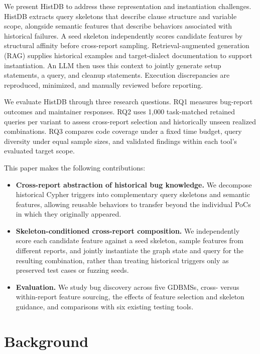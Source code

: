 \documentclass[acmsmall,screen,anonymous]{acmart}
\begin{document}
We present HistDB to address these representation and instantiation challenges. HistDB extracts query skeletons that describe clause structure and variable scope, alongside semantic features that describe behaviors associated with historical failures. A seed skeleton independently scores candidate features by structural affinity before cross-report sampling. Retrieval-augmented generation (RAG) supplies historical examples and target-dialect documentation to support instantiation. An LLM then uses this context to jointly generate setup statements, a query, and cleanup statements. Execution discrepancies are reproduced, minimized, and manually reviewed before reporting.

We evaluate HistDB through three research questions. RQ1 measures bug-report outcomes and maintainer responses. RQ2 uses 1,000 task-matched retained queries per variant to assess cross-report selection and historically unseen realized combinations. RQ3 compares code coverage under a fixed time budget, query diversity under equal sample sizes, and validated findings within each tool's evaluated target scope.

This paper makes the following contributions:
\begin{itemize}
\item \textbf{Cross-report abstraction of historical bug knowledge.} We decompose historical Cypher triggers into complementary query skeletons and semantic features, allowing reusable behaviors to transfer beyond the individual PoCs in which they originally appeared.
\item \textbf{Skeleton-conditioned cross-report composition.} We independently score each candidate feature against a seed skeleton, sample features from different reports, and jointly instantiate the graph state and query for the resulting combination, rather than treating historical triggers only as preserved test cases or fuzzing seeds.
\item \textbf{Evaluation.} We study bug discovery across five GDBMSs, cross- versus within-report feature sourcing, the effects of feature selection and skeleton guidance, and comparisons with six existing testing tools.
\end{itemize}

\section{Background}
\label{sec:background}
\end{document}
